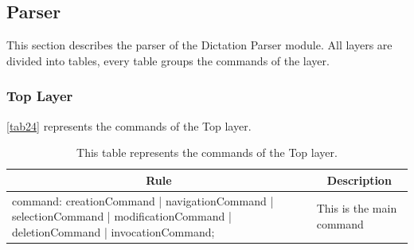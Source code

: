 \subsection{Parser}
This section describes the parser of the Dictation Parser module. All layers are divided into tables, every table groups the commands of the layer.

\subsubsection{Top Layer}
\autoref{tab24} represents the commands of the Top layer.
\begin{table}[H]
\centering
\begin{tabular}{|p{8cm}|p{7cm}|}
\hline
\multicolumn{1}{|c|}{{\bf Rule}}                                                                                             & \multicolumn{1}{c|}{{\bf Description}} \\ \hline
command: creationCommand | navigationCommand | selectionCommand | modificationCommand | deletionCommand | invocationCommand; & This is the main command               \\ \hline
\end{tabular}
\caption{This table represents the commands of the Top layer.}
\label{tab24}
\end{table}

